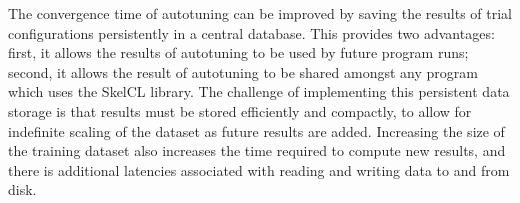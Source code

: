 The convergence time of autotuning can be improved by saving the
results of trial configurations persistently in a central
database. This provides two advantages: first, it allows the results
of autotuning to be used by future program runs; second, it allows the
result of autotuning to be shared amongst any program which uses the
SkelCL library. The challenge of implementing this persistent data
storage is that results must be stored efficiently and compactly, to
allow for indefinite scaling of the dataset as future results are
added. Increasing the size of the training dataset also increases the
time required to compute new results, and there is additional
latencies associated with reading and writing data to and from disk.
